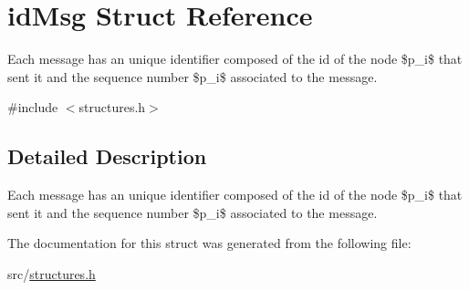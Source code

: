 \hypertarget{structid_msg}{}\section{id\+Msg Struct Reference}
\label{structid_msg}


Each message has an unique identifier composed of the id of the node \$p\+\_\+i\$ that sent it and the sequence number \$p\+\_\+i\$ associated to the message.  




{\ttfamily \#include $<$structures.\+h$>$}



\subsection{Detailed Description}
Each message has an unique identifier composed of the id of the node \$p\+\_\+i\$ that sent it and the sequence number \$p\+\_\+i\$ associated to the message. 

The documentation for this struct was generated from the following file\+:\begin{DoxyCompactItemize}
\item 
src/\hyperlink{structures_8h}{structures.\+h}\end{DoxyCompactItemize}
